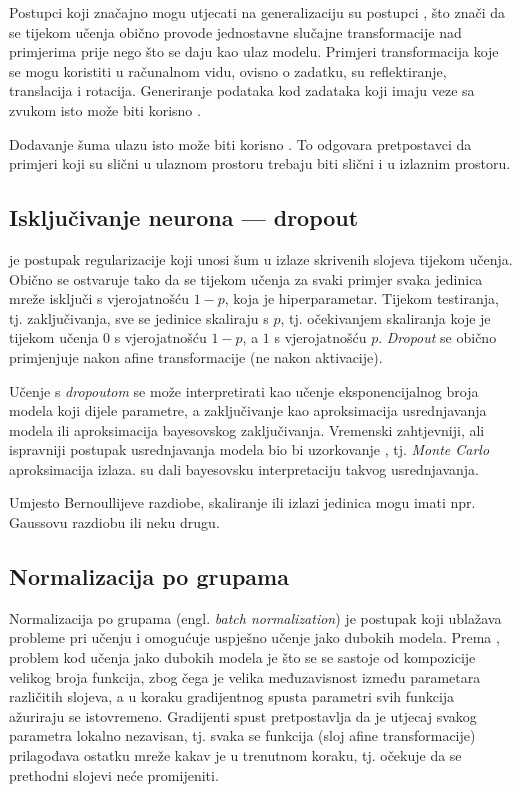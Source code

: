 \documentclass[utf8, diplomski, lmodern]{fer}
\begin{document}
Postupci koji značajno mogu utjecati na generalizaciju su postupci , što znači da se tijekom učenja obično provode jednostavne slučajne transformacije nad primjerima prije nego što se daju kao ulaz modelu. Primjeri transformacija koje se mogu koristiti u računalnom vidu, ovisno o zadatku, su reflektiranje, translacija i rotacija. Generiranje podataka kod zadataka koji imaju veze sa zvukom isto može biti korisno \cite{Goodfellow:2016:DL}.

Dodavanje šuma ulazu isto može biti korisno \citep{Goodfellow:2016:DL}. To odgovara pretpostavci da primjeri koji su slični u ulaznom prostoru trebaju biti slični i u izlaznim prostoru.

\subsection{Isključivanje neurona --- dropout} \label{subsec:dropout}

 \citep{Hinton:2012:INNPCAFD,Srivastava:2014:DASWPNNO} je postupak regularizacije koji unosi šum u izlaze skrivenih slojeva tijekom učenja. Obično se ostvaruje tako da se tijekom učenja za svaki primjer svaka jedinica mreže isključi s vjerojatnošću $1-p$, koja je hiperparametar. Tijekom testiranja, tj. zaključivanja, sve se jedinice skaliraju s $p$, tj. očekivanjem skaliranja koje je tijekom učenja $0$ s vjerojatnošću $1-p$, a $1$ s vjerojatnošću $p$. \textit{Dropout} se obično primjenjuje nakon afine transformacije (ne nakon aktivacije).

Učenje s \textit{dropoutom} se može interpretirati kao učenje eksponencijalnog broja modela koji dijele parametre, a zaključivanje kao aproksimacija usrednjavanja modela ili aproksimacija bayesovskog zaključivanja. Vremenski zahtjevniji, ali ispravniji postupak usrednjavanja modela bio bi uzorkovanje \citep{Srivastava:2014:DASWPNNO}, tj. \textit{Monte Carlo} aproksimacija izlaza. \citet{Gal:2015:DBA} su dali bayesovsku interpretaciju takvog usrednjavanja. 

Umjesto Bernoullijeve razdiobe, skaliranje ili izlazi jedinica mogu imati npr. Gaussovu razdiobu ili neku drugu.

\subsection{Normalizacija po grupama}

Normalizacija po grupama (engl. \textit{batch normalization}) \citep{Ioffe:2015:BNADNTRUCS} je postupak koji ublažava probleme pri učenju i omogućuje uspješno učenje jako dubokih modela. Prema \citet{Goodfellow:2016:DL}, problem kod učenja jako dubokih modela je što se se sastoje od kompozicije velikog broja funkcija, zbog čega je velika međuzavisnost između parametara različitih slojeva, a u koraku gradijentnog spusta parametri svih funkcija ažuriraju se istovremeno. Gradijenti spust pretpostavlja da je utjecaj svakog parametra lokalno nezavisan, tj. svaka se funkcija (sloj afine transformacije) prilagođava ostatku mreže kakav je u trenutnom koraku, tj. očekuje da se prethodni slojevi neće promijeniti.
\end{document}
